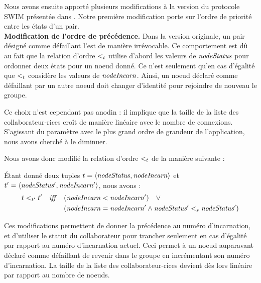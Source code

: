 Nous avons ensuite apporté plusieurs modifications à la version du protocole SWIM présentée dans \cite{swim2002}.
Notre première modification porte sur l'ordre de priorité entre les états d'un pair.\\

\textbf{Modification de l'ordre de précédence.}
\label{sec:swim-modif-precedence-order}
Dans la version originale, un pair désigné comme défaillant l'est de manière irrévocable.
Ce comportement est dû au fait que la relation d'ordre $<_{t}$ utilise d'abord les valeurs de $\mathit{nodeStatus}$ pour ordonner deux états pour un noeud donné.
Ce n'est seulement qu'en cas d'égalité que $<_{t}$ considère les valeurs de $\mathit{nodeIncarn}$.
Ainsi, un noeud déclaré comme défaillant par un autre noeud doit changer d'identité pour rejoindre de nouveau le groupe.

Ce choix n'est cependant pas anodin : il implique que la taille de la liste des collaborateur-rices croît de manière linéaire avec le nombre de connexions.
S'agissant du paramètre avec le plus grand ordre de grandeur de l'application, nous avons cherché à le diminuer.

Nous avons donc modifié la relation d'ordre $<_{t}$ de la manière suivante :

\begin{definition}
    Étant donné deux tuples $t = \langle \mathit{nodeStatus},\mathit{nodeIncarn} \rangle$ et $t' = \langle \mathit{nodeStatus'},\mathit{nodeIncarn'} \rangle$, nous avons :
    \begin{equation*}
      \begin{split}
        t <_{t'} t' \quad \mathit{iff} \quad  & (\mathit{nodeIncarn} < \mathit{nodeIncarn'}) \quad \lor \\
                                            & (\mathit{nodeIncarn} = \mathit{nodeIncarn'} \land \mathit{nodeStatus'} <_{s} \mathit{nodeStatus'}) \\
      \end{split}
    \end{equation*}
  \end{definition}

Ces modifications permettent de donner la précédence au numéro d'incarnation, et d'utiliser le statut du collaborateur pour trancher seulement en cas d'égalité par rapport au numéro d'incarnation actuel.
Ceci permet à un noeud auparavant déclaré comme défaillant de revenir dans le groupe en incrémentant son numéro d'incarnation.
La taille de la liste des collaborateur-rices devient dès lors linéaire par rapport au nombre de noeuds.

